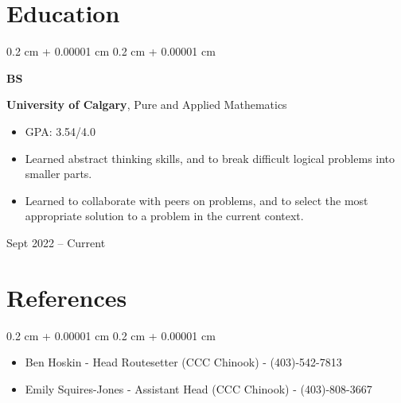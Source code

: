 \documentclass[10pt, letterpaper]{article}
\newenvironment{highlights}{
    \begin{itemize}[
        topsep=0.10 cm,
        parsep=0.10 cm,
        partopsep=0pt,
        itemsep=0pt,
        leftmargin=0.4 cm + 10pt
    ]
}{
    \end{itemize}
} %
\newenvironment{onecolentry}{
    \begin{adjustwidth}{
        0.2 cm + 0.00001 cm
    }{
        0.2 cm + 0.00001 cm
    }
}{
    \end{adjustwidth}
} %
\newenvironment{threecolentry}[3][]{
    \onecolentry
    \def\thirdColumn{#3}
    \setcolumnwidth{1 cm, \fill, 4.5 cm}
    \begin{paracol}{3}
    {\raggedright #2} \switchcolumn
}{
    \switchcolumn \raggedleft \thirdColumn
    \end{paracol}
    \endonecolentry
} %
\begin{document}
    \section{Education}

        \begin{threecolentry}{\textbf{BS}}{
            Sept 2022 – Current
        }
            \textbf{University of Calgary}, Pure and Applied Mathematics
            \begin{highlights}
                \item GPA: 3.54/4.0 
                \item Learned abstract thinking skills, and to break difficult logical problems into smaller parts.
                \item Learned to collaborate with peers on problems, and to select the most appropriate solution to a problem in the current context.
            \end{highlights}
        \end{threecolentry}

    \section{References}
        \begin{onecolentry}
            \begin{highlights}
                \item Ben Hoskin - Head Routesetter (CCC Chinook) - (403)-542-7813
                \item Emily Squires-Jones - Assistant Head (CCC Chinook) - (403)-808-3667
            \end{highlights}
        \end{onecolentry}
\end{document}
